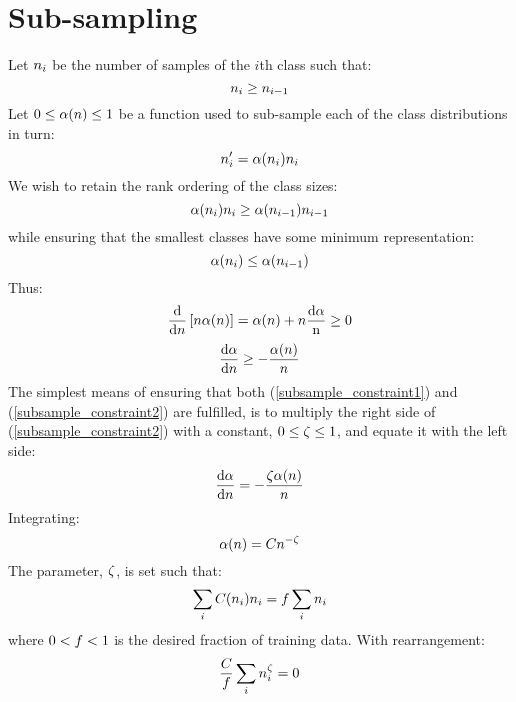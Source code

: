 \section{Sub-sampling}
\label{shuttle_subsampling}

Let $n_i$ be the number of samples of the $i$th class such
that:
\begin{equation*}
n_i \ge n_{i-1}
\end{equation*}
Let $0 \le \alpha(n) \le 1$ be a function used to sub-sample each of the class
distributions in turn:
\begin{equation*}
n_i^\prime = \alpha(n_i) n_i
\end{equation*}
We wish to retain the rank ordering of the class sizes:
\begin{equation*}
\alpha(n_i) n_i 
\ge \alpha(n_{i-1}) n_{i-1} 
\end{equation*}
while ensuring that the smallest classes have some minimum representation:
\begin{equation}
\alpha(n_i) \le \alpha(n_{i-1})
\label{subsample_constraint1}
\end{equation}
Thus:
\begin{equation*}
	\frac{\mathrm d}{\mathrm d n} \left [ n \alpha(n) \right ] = \alpha(n) + n \frac{\mathrm d \alpha}{\mathrm n} \ge 0
\end{equation*}
\begin{equation}
	\frac{\mathrm d \alpha}{\mathrm d n} \ge - \frac{\alpha(n)}{n}
\label{subsample_constraint2}
\end{equation}
The simplest means of ensuring that both (\ref{subsample_constraint1}) and
(\ref{subsample_constraint2}) are fulfilled, is to multiply the right side
of (\ref{subsample_constraint2}) with a constant, $0 \le \zeta \le 1$,
and equate it with the left side:
\begin{equation*}
	\frac{\mathrm d \alpha}{\mathrm d n} = - \frac{\zeta \alpha(n)}{n}
\end{equation*}
Integrating:
\begin{equation*}
	\alpha(n)=C n^{-\zeta}
\end{equation*}
The parameter, $\zeta$, is set such that:
\begin{equation*}
	\sum_i C(n_i) n_i = f \sum_i n_i
\end{equation*}
where $0 < f < 1$ is the desired fraction of training data.
With rearrangement:
\begin{equation*}
	\frac{C}{f} \sum_i n_i^\zeta = 0
\end{equation*}

